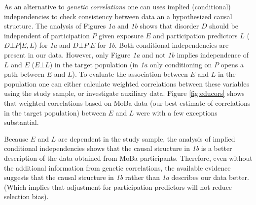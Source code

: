 \documentclass[12pt]{article}
\begin{document}
As an alternative to \emph{genetic correlations} one can uses implied (conditional) independencies to check consistency between data an a hypothesized causal structure. The analysis of Figures \emph{1a} and \emph{1b} shows that disorder $D$ should be independent of participation $P$ given exposure $E$ and participation predictors $L$ ($D \bot P|E,L$) for \emph{1a} and $D \bot P | E$ for \emph{1b}. Both conditional independencies are present in our data. However, only Figure \emph{1a} and not \emph{1b} implies independence of $L$ and $E$ ($E \bot L$) in the target population (in \emph{1a} only conditioning on $P$ opens a path between $E$ and $L$). To evaluate the association between $E$ and $L$ in the population one can either calculate weighted correlations between these variables using the study sample, or investigate auxiliary data. Figure \ref{fig:educors} shows that weighted correlations based on MoBa data (our best estimate of correlations in the target population) between $E$ and $L$ were with a few exceptions substantial. 

Because $E$ and $L$ are dependent in the study sample, the analysis of implied conditional independencies shows that the causal structure in \emph{1b} is a better description of the data obtained from MoBa participants. Therefore, even without the additional information from genetic correlations, the available evidence suggests that the causal structure in \emph{1b} rather than \emph{1a} describes our data better. (Which implies that adjustment for participation predictors will not reduce selection bias).



	


\printbibliography
\end{document}
